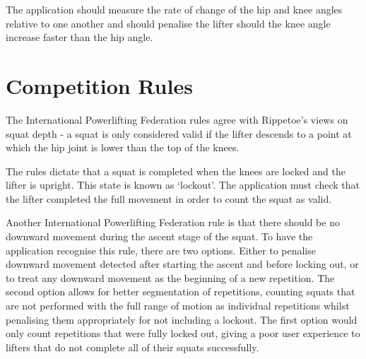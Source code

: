 The application should measure the rate of change of the hip and knee angles relative to one another and should penalise the lifter should the knee angle increase faster than the hip angle.

\section{Competition Rules}

The International Powerlifting Federation rules\cite{ipf} agree with Rippetoe's views on squat depth - a squat is only considered valid if the lifter descends to a point at which the hip joint is lower than the top of the knees.

The rules dictate that a squat is completed when the knees are locked and the lifter is upright. This state is known as `lockout'. The application must check that the lifter completed the full movement in order to count the squat as valid.

Another International Powerlifting Federation rule is that there should be no downward movement during the ascent stage of the squat. To have the application recognise this rule, there are two options. Either to penalise downward movement detected after starting the ascent and before locking out, or to treat any downward movement as the beginning of a new repetition. The second option allows for better segmentation of repetitions, counting squats that are not performed with the full range of motion as individual repetitions whilst penalising them appropriately for not including a lockout. The first option would only count repetitions that were fully locked out, giving a poor user experience to lifters that do not complete all of their squats successfully.